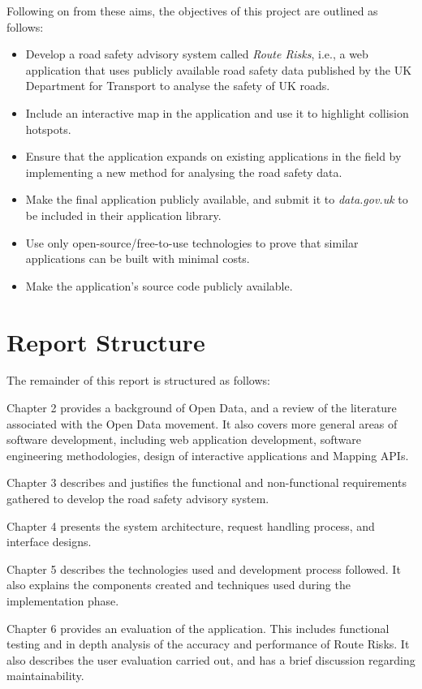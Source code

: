 \documentclass[authoryearcitations]{UoYCSproject}
\begin{document}
Following on from these aims, the objectives of this project are outlined as follows:

\begin{itemize}
	\item Develop a road safety advisory system called \emph{Route Risks}, i.e., a web application that uses publicly available road safety data published by the UK Department for Transport to analyse the safety of UK roads.
	\item Include an interactive map in the application and use it to highlight collision hotspots.
	\item Ensure that the application expands on existing applications in the field by implementing a new method for analysing the road safety data.
	\item Make the final application publicly available, and submit it to \textit{data.gov.uk} to be included in their application library.
	\item Use only open-source/free-to-use technologies to prove that similar applications can be built with minimal costs.
	\item Make the application's source code publicly available.
\end{itemize}


\section{Report Structure}
The remainder of this report is structured as follows:

Chapter 2 provides a background of Open Data, and a review of the literature associated with the Open Data movement. It also covers more general areas of software development, including web application development, software engineering methodologies, design of interactive applications and Mapping APIs.

Chapter 3 describes and justifies the functional and non-functional requirements gathered to develop the road safety advisory system.

Chapter 4 presents the system architecture, request handling process, and interface designs.

Chapter 5 describes the technologies used and development process followed. It also explains the components created and techniques used during the implementation phase.

Chapter 6 provides an evaluation of the application. This includes functional testing and in depth analysis of the accuracy and performance of Route Risks. It also describes the user evaluation carried out, and has a brief discussion regarding maintainability.
\end{document}
